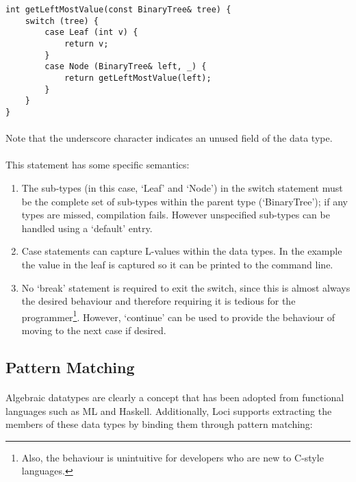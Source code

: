 \documentclass[12pt,twoside,notitlepage]{report}
\begin{document}
\begin{lstlisting}
int getLeftMostValue(const BinaryTree& tree) {
	switch (tree) {
		case Leaf (int v) {
			return v;
		}
		case Node (BinaryTree& left, _) {
			return getLeftMostValue(left);
		}
	}
}
\end{lstlisting}

\paragraph{}
Note that the underscore character indicates an unused field of the data type.

\paragraph{}
This statement has some specific semantics:

\begin{enumerate}
\item The sub-types (in this case, `Leaf' and `Node') in the switch statement must be the complete set of sub-types within the parent type (`BinaryTree'); if any types are missed, compilation fails. However unspecified sub-types can be handled using a `default' entry.
\item Case statements can capture L-values within the data types. In the example the value in the leaf is captured so it can be printed to the command line.
\item No `break' statement is required to exit the switch, since this is almost always the desired behaviour and therefore requiring it is tedious for the programmer\footnote{Also, the behaviour is unintuitive for developers who are new to C-style languages.}. However, `continue' can be used to provide the behaviour of moving to the next case if desired.
\end{enumerate}

\clearpage

\subsection{Pattern Matching}

\paragraph{}
Algebraic datatypes are clearly a concept that has been adopted from functional languages such as ML and Haskell. Additionally, Loci supports extracting the members of these data types by binding them through pattern matching:
\end{document}
